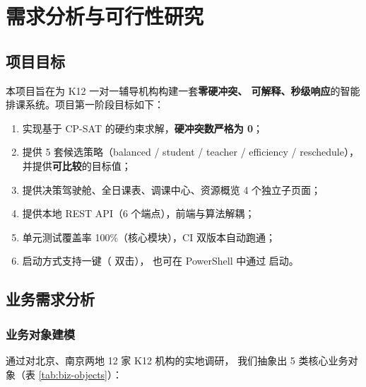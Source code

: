 ﻿%
\section{需求分析与可行性研究}

\subsection{项目目标}

本项目旨在为 K12 一对一辅导机构构建一套\textbf{零硬冲突、
可解释、秒级响应}的智能排课系统。项目第一阶段目标如下：

\begin{enumerate}[leftmargin=2em,itemsep=0.2em]
\item 实现基于 CP-SAT 的硬约束求解，\textbf{硬冲突数严格为 0}；
\item 提供 5 套候选策略（balanced / student / teacher / efficiency / reschedule），
并提供\textbf{可比较}的目标值；
\item 提供决策驾驶舱、全日课表、调课中心、资源概览 4 个独立子页面；
\item 提供本地 REST API（6 个端点），前端与算法解耦；
\item 单元测试覆盖率 100\%（核心模块），CI 双版本自动跑通；
\item 启动方式支持一键（ 双击），
也可在 PowerShell 中通过  启动。
\end{enumerate}

\subsection{业务需求分析}

\subsubsection{业务对象建模}

通过对北京、南京两地 12 家 K12 机构的实地调研，
我们抽象出 5 类核心业务对象（表 \ref{tab:biz-objects}）：

